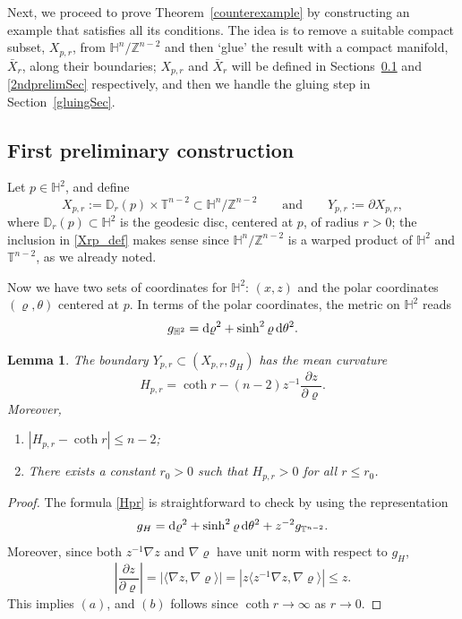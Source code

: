 \documentclass[10pt,a4paper]{amsart}
\numberwithin{equation}{section}
\newtheorem{Lemma}[Theorem]{Lemma}
\def\H{\mathbb{H}}
\def\T{\mathbb{T}}
\def\Z{\mathbb{Z}}
\def\D{\mathbb{D}}
\def\ed{{\rm d}}
\begin{document}
Next, we proceed to prove
Theorem~\ref{counterexample} by constructing an example
that satisfies all its conditions. The idea is to remove a suitable compact
subset, $X_{p,r}$, from $\H^n/\Z^{n-2}$ and then `glue' the result with a
compact manifold, $\bar X_r$, along their boundaries; $X_{p,r}$ and
$\bar X_r$ will be defined in Sections~\ref{1stprelimSec} and \ref{2ndprelimSec}
respectively, and then we handle the gluing step
in Section~\ref{gluingSec}.






\subsection{First preliminary construction}\label{1stprelimSec}
Let $p\in \H^2$, and define
\begin{equation}\label{Xrp_def}
	X_{p,r}:= \D_r(p)\times \T^{n-2}\subset \H^{n}/\Z^{n-2} \qquad
	\mbox{and} \qquad  Y_{p,r} :=\partial X_{p,r},
\end{equation}
where $\D_r(p)\subset \H^2$ is the geodesic disc, centered at $p$, of radius $r>0$;
the inclusion in \eqref{Xrp_def} makes sense since $\H^n/\Z^{n-2}$ is a warped product
of $\H^2$ and $\T^{n-2}$, as we already noted.

Now we have two sets of coordinates for $\H^2$: $(x,z)$ and the polar coordinates
$(\varrho,\theta)$ centered at $p$. In terms of the polar coordinates, the metric on $\H^2$ reads
\begin{equation*}%
	g_{\H^2} = \ed\varrho^2 + \sinh^2\varrho\,\ed\theta^2.
\end{equation*}



\begin{Lemma}\label{YprMean}
The boundary $Y_{p,r}\subset (X_{p,r}, g_H)$ has the mean curvature
\begin{equation}\label{Hpr}
	H_{p,r}=\coth r-(n-2)z^{-1}\frac{\partial z}{\partial \varrho}.
\end{equation}
Moreover,
\begin{enumerate}\itemsep=0pt
    \item[$(a)$] $|H_{p,r} - \coth r| \leq n-2$;
	\item[$(b)$] There exists a constant $r_0>0$ such that $H_{p,r}>0$ for all $r\leq r_0$.
\end{enumerate}

\end{Lemma}
\begin{proof}
The formula \eqref{Hpr} is straightforward to check by using the representation
\[
	g_H = \ed\varrho^2 + \sinh^2\varrho\,\ed\theta^2 + z^{-2}g_{\T^{n-2}}.
\]
Moreover, since both $z^{-1}\nabla z$ and $\nabla \varrho$ have unit norm with respect to $g_H$,
\begin{equation}\label{dzdrhoBd}
\left|\frac{\partial z}{\partial \varrho}\right|
= \left|\bigl\langle\nabla z, \nabla \varrho \bigr\rangle\right| =\left|z\bigl\langle z^{-1}\nabla z, \nabla \varrho \bigr\rangle\right|\le z.
\end{equation}
This implies $(a)$, and $(b)$ follows since $\coth r\rightarrow\infty$ as
$r\rightarrow 0$.
\end{proof}
\end{document}
